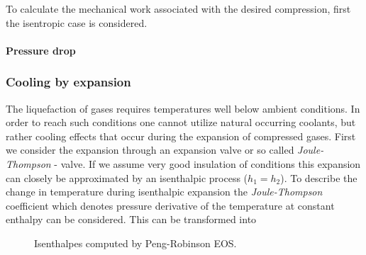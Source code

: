     	To calculate the mechanical work associated with the desired compression,
        first the isentropic case
        is considered.


    	\paragraph{Pressure drop}

    \subsubsection{Cooling by expansion}
        The liquefaction of gases requires temperatures well below ambient conditions. In order to reach
        such conditions one cannot utilize natural occurring coolants, but rather cooling effects that occur
        during the expansion of compressed gases. First we consider the expansion through an expansion valve
        or so called \emph{Joule-Thompson} - valve. If we assume very good insulation of  conditions this
        expansion can closely be approximated by an isenthalpic process ($h_1 = h_2$). To describe the change
        in temperature during isenthalpic expansion the \emph{Joule-Thompson} coefficient
        which denotes pressure derivative of the temperature at constant enthalpy can be considered.
        This can be transformed into


        \begin{figure}
            \center
            
            \caption{Isenthalpes computed by Peng-Robinson EOS.}
            \label{fig:pr_isenthalpes}
        \end{figure}

